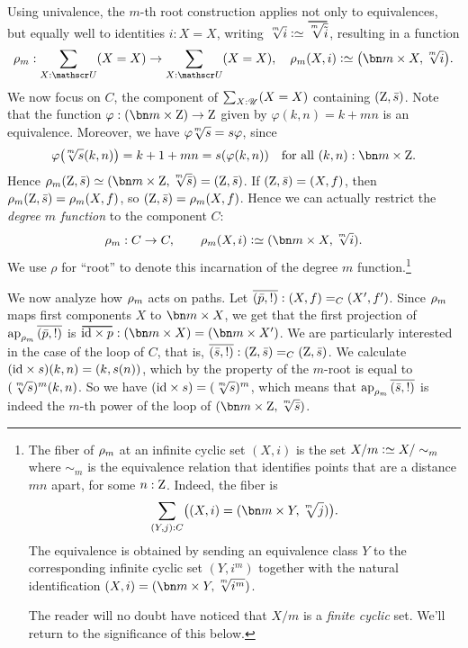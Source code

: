 \begin{example}
Using univalence, the $m$-th root construction applies not only to equivalences,
but equally well to identities $i:X=X$,
writing $\sqrt[\uproot{2}m]{i} \defeq \overetop{\sqrt[\uproot{2}m]{\ptoe{i}}}$,
resulting in a function
\[
  \cdg{m}:\sum_{X:\UU}(X=X)\to\sum_{X:\UU}(X=X),\quad
  \cdg{m}(X,i) \defeq \bigl(\bn m\times X, \textstyle\sqrt[\uproot{2}m]{i}\bigr).
\]
We now focus on  $C$, the component of $\sum_{X:{\mathscr{U}}}(X=X)$ containing $(\mathrm{Z},\bar {s})$.
Note
that the function $\varphi : (\bn m\times \zet) \to \zet$
given by $\varphi(k,n)=k+mn$ is an equivalence.
Moreover, we have ${\varphi\!\sqrt[\uproot{2}m]s} = {s\varphi}$, since
\[
  \varphi\bigl(\!\sqrt[\uproot{2}m]s(k,n)\bigr)
  = k+1+mn = s(\varphi(k,n))
  \quad\text{for all $(k,n):\bn m\times \zet$}.
\]
Hence $\cdg{m}(\zet,\etop{s}) \jdeq (\bn m\times\zet,\sqrt[\uproot{2}m]{\etop{s}}) = (\zet,\etop{s})$.
If $(\mathrm{Z},\bar {s})=(X,f)$, then $\cdg{m}(\zet,\etop{s})=\cdg{m}(X,f)$,
so $(\zet,\etop{s})=\cdg{m}(X,f)$. Hence we can actually restrict the
\emph{degree $m$ function} to the component $C$:
\[
  \cdg{m}:C\to C,\qquad
  \cdg{m}(X,i)\defeq(\bn m\times X,{\textstyle\sqrt[\uproot{2}m]i}).
\]
We use $\rho$ for ``root'' to denote this incarnation
of the degree $m$ function.\footnote{%
  \label{ft:infinite-cyclic-modulo}%
  The fiber of $\cdg{m}$ at an infinite cyclic set $(X,i)$ is the set
  $X/m \defeq X/\sim_m$ where $\sim_m$ is the equivalence relation that
  identifies points that are a distance $mn$ apart, for some $n:\mathrm{Z}$.
  Indeed, the fiber is
  \[
    \sum_{(Y,j):C}\bigl((X,i) = (\bn m\times Y, \sqrt[\uproot{2}m]{j})\bigr).
  \]
  The equivalence is obtained by sending an equivalence class $Y$ to
  the corresponding infinite cyclic set $(Y,i^m)$ together with the
  natural identification $(X,i) = (\bn m\times Y, \sqrt[\uproot{2}m]{i^m})$.

  The reader will no doubt have noticed that $X/m$ is a \emph{finite cyclic} set.
  We'll return to the significance of this below.}

We now analyze how $\cdg{m}$ acts on paths.
Let $\overline{({\bar {p}},{!})}:(X,f)=_C(X',f')$.
Since $\cdg{m}$ maps first components $X$ to $\bn m\times X$, we get that
the first projection of $\ap{\cdg{m}}\pathpair{\etop{p}}{!}$ is
$\overetop{\id\times p} : (\bn m\times X) = (\bn m\times X')$.
We are particularly interested in the case of the loop of $C$,
that is, $\overline{({\bar {s}},{!})}:(\mathrm{Z},\bar {s})=_C(\mathrm{Z},\bar {s})$.
We calculate $(\mathord{\mathrm{id}}\times s)(k,n) = (k,s(n))$,
which by the property of the $m$-root is equal to $(\sqrt[\uproot{2}m]s)^m(k,n)$.
So we have $(\id\times s)=(\sqrt[\uproot{2}m]s)^m$, which means that
$\ap{\cdg{m}}\pathpair{\etop{s}}{!}$ is indeed the $m$-th power of the
loop of $(\bn m\times \zet,\sqrt[\uproot{2}m]{\etop{s}})$.


\end{example}
